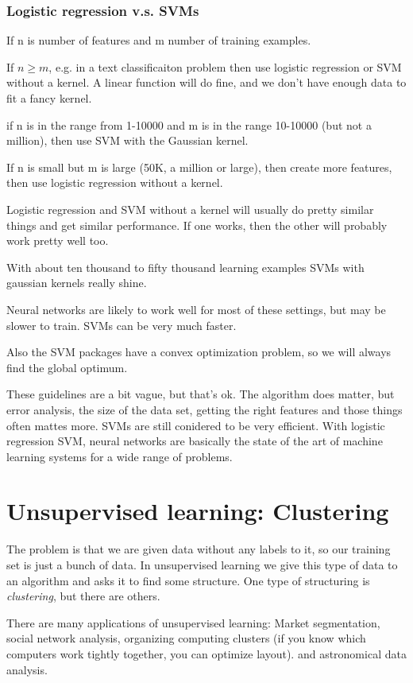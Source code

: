 \documentclass[a4, 12pt, english, USenglish]{scrreprt}
\newcommand{\idx}[1]{{\em #1}\index{#1}}
\begin{document}
\subsection{Logistic regression v.s. SVMs}

If n is number of features and m number of training examples.

If \(n\geq m\), e.g. in a text classificaiton problem then use
logistic regression or SVM without a kernel.  A linear function will
do fine, and we don't have enough data to fit a fancy kernel.

if n is in the  range from 1-10000 and m is in the range 10-10000 (but
not a million), then use SVM with the Gaussian kernel.

If n is small but m is large (50K, a million or large), then create
more features, then use logistic regression without a kernel.

Logistic regression and SVM without a kernel will usually do pretty
similar things and get similar performance.  If one works, then the
other will probably work pretty well too.

With about ten thousand  to fifty thousand learning examples SVMs with
gaussian kernels really shine.

Neural networks are likely to work well for most of these settings,
but may be slower to train.  SVMs can be very much faster.

Also the SVM packages have a convex optimization problem, so we will
always find the global optimum.

These guidelines are a bit vague, but that's ok.     The algorithm
does matter, but error analysis, the size of the data set, getting the
right features and those things often mattes more.   SVMs are still
conidered to be very efficient.   With logistic regression SVM, neural
networks are basically the state of the art of machine learning
systems for a wide range of problems.

\chapter{Unsupervised learning: Clustering}

The problem is that we are given data without any labels to it, so our
training set is just a bunch of data.   In unsupervised learning we
give this type of data to an algorithm and asks it to find some
structure.   One type of structuring is \idx{clustering}, but there
are others.   

There are many applications of  unsupervised learning:  Market
segmentation, social network analysis, organizing computing clusters
(if you know which computers work tightly together, you can optimize layout).
and astronomical data analysis.
\end{document}
